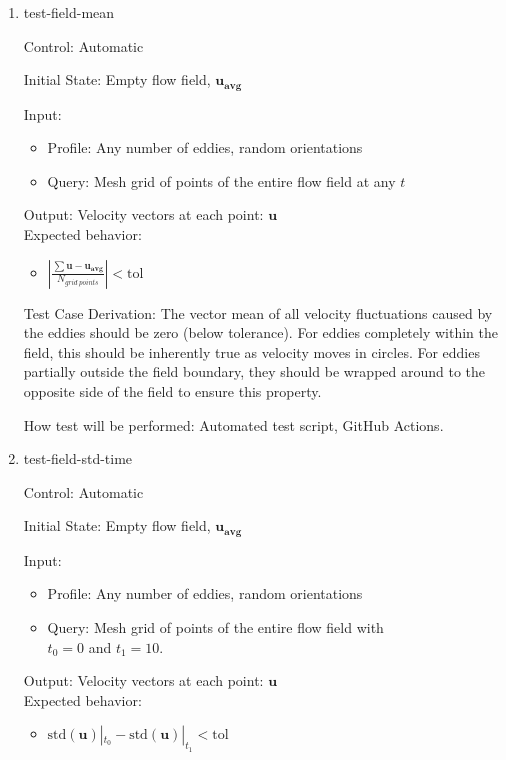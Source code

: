 \documentclass[12pt, titlepage]{article}
\begin{document}
\begin{enumerate}

  \item{test-field-mean\\}

  Control: Automatic
            
  Initial State: Empty flow field, $\mathbf{u_{avg}}$
            
  Input:
  \begin{itemize}
    \item Profile: Any number of eddies, random orientations
    \item Query: Mesh grid of points of the entire flow field at any $t$
  \end{itemize}
  Output: Velocity vectors at each point: $\mathbf{u}$\\
  Expected behavior:
  \begin{itemize}
    \item $|\frac{\sum\mathbf{u}-\mathbf{u_{avg}}}{N_{grid~points}}| < \text{tol}$
  \end{itemize}

  Test Case Derivation: The vector mean of all velocity fluctuations caused by the eddies should be zero (below tolerance). For eddies completely within the field, this should be inherently true as velocity moves in circles. For eddies partially outside the field boundary, they should be wrapped around to the opposite side of the field to ensure this property.
            
  How test will be performed: Automated test script, GitHub Actions.

  \item{test-field-std-time\\}

  Control: Automatic
            
  Initial State: Empty flow field, $\mathbf{u_{avg}}$
            
  Input:
  \begin{itemize}
    \item Profile: Any number of eddies, random orientations
    \item Query: Mesh grid of points of the entire flow field with \\ $t_0=0$ and $t_1=10$.
  \end{itemize}
  Output: Velocity vectors at each point: $\mathbf{u}$\\
  Expected behavior:
  \begin{itemize}
    \item $\text{std}(\mathbf{u})|_{t_0} - \text{std}(\mathbf{u})|_{t_1} < \text{tol}$
  \end{itemize}


\end{enumerate}
\end{document}

